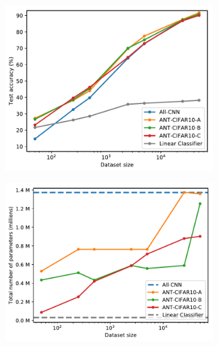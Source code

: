 \begin{figure}[t!]
	\centering
	\begin{subfigure}[t]{0.295\linewidth}
		\includegraphics[width=\linewidth]{chapter_7/figures/fig_1_2.pdf}
	\end{subfigure}
	\hspace{0mm}
	\begin{subfigure}[t]{0.305\linewidth}
		\includegraphics[width=\linewidth]{chapter_7/figures/fig_2_2.pdf}
	\end{subfigure}
	\hspace{0mm}
	\begin{subfigure}[t]{0.32\linewidth}

\end{subfigure}
\end{figure}
